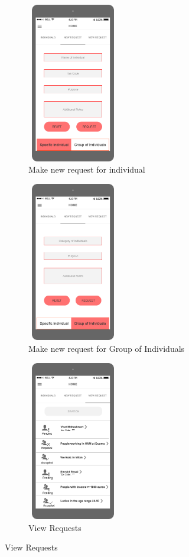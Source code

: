 \begin{figure}[H]
	\centering
     \begin{subfigure}[b]{0.4\textwidth}	
		\includegraphics[width=4cm,height=7cm]		{./Mockups/4_T_1-NewRequest.png}
      	\caption{Make new request for individual}
        \label{TrackMe_reqind}
	 \end{subfigure}
     \begin{subfigure}[b]{0.4\textwidth}	
		\includegraphics[width=4cm,height=7cm]		{./Mockups/4_T_2-NewRequest.png}
      	\caption{Make new request for Group of Individuals}
        \label{TrackMe_reqgroup}
	 \end{subfigure}
     \begin{subfigure}[b]{0.4\textwidth}	
		\includegraphics[width=4cm,height=7cm]		{./Mockups/5_T-ViewRequest.png}
      	\caption{View Requests}
        \label{TrackMe_viewreq}
	 \end{subfigure}
\end{figure}
